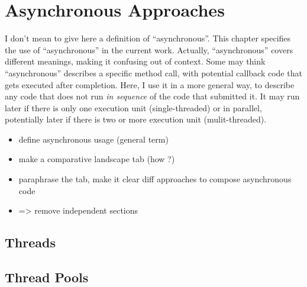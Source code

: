 
\chapter{Asynchronous Approaches}
\label{ch:asyncworld}

I don't mean to give here a definition of ``asynchronous''.
This chapter specifies the use of ``asynchronous'' in the current work. Actually, ``asynchronous'' covers different meanings, making it confusing out of context.
Some may think ``asynchronous'' describes a specific method call, with potential callback code that gets executed after completion. Here, I use it in a more general way, to describe any code that does not run \emph{in sequence} of the code that submitted it. It may run later if there is only one execution unit (single-threaded) or in parallel, potentially later if there is two or more execution unit (mulit-threaded).


\begin{itemize}
\item define asynchronous usage (general term)
\item make a comparative landscape tab (how ?)
\item paraphrase the tab, make it clear diff approaches to compose asynchronous code
\item  => remove independent sections
\end{itemize}


\section{Threads}

\section{Thread Pools}

